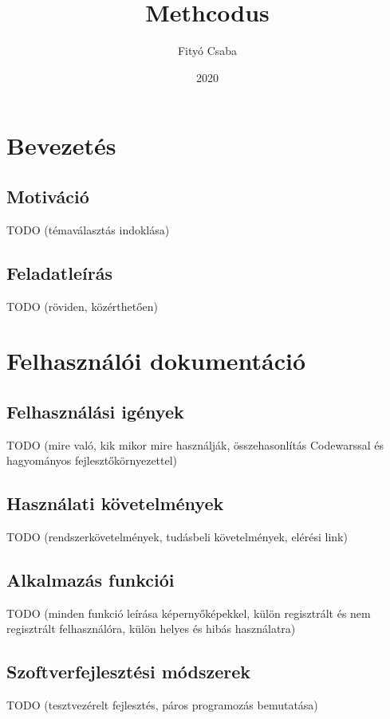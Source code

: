 \documentclass{elteikthesis}
\title{Methcodus}
\date{2020}
\author{Fityó Csaba}
\affiliation{mesteroktató}
\begin{document}

	\maketitle

	\tableofcontents

	\chapter{Bevezetés}

		\section{Motiváció}
		TODO (témaválasztás indoklása)

		\section{Feladatleírás}
		TODO (röviden, közérthetően)

	\chapter{Felhasználói dokumentáció}

		\section{Felhasználási igények}
		TODO (mire való, kik mikor mire használják, összehasonlítás Codewarssal és hagyományos fejlesztőkörnyezettel)
		
		\section{Használati követelmények}
		TODO (rendszerkövetelmények, tudásbeli követelmények, elérési link)
		
		\section{Alkalmazás funkciói}
		TODO (minden funkció leírása képernyőképekkel, külön regisztrált és nem regisztrált felhasználóra, külön helyes és hibás használatra)
		
		\section{Szoftverfejlesztési módszerek}
		TODO (tesztvezérelt fejlesztés, páros programozás bemutatása)
\end{document}
